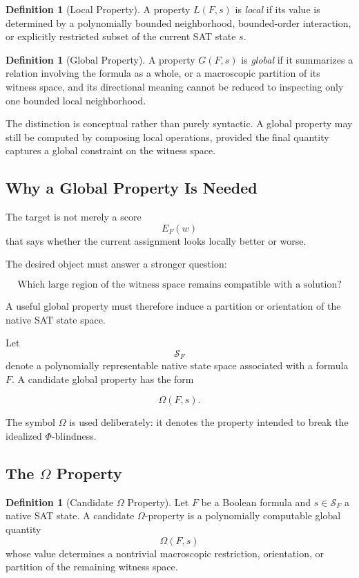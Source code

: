 \documentclass[11pt]{article}
\theoremstyle{plain}
\theoremstyle{definition}
\newtheorem{definition}[theorem]{Definition}
\begin{document}
\begin{definition}[Local Property]
A property \(L(F,s)\) is \emph{local} if its value is determined by a
polynomially bounded neighborhood, bounded-order interaction, or explicitly
restricted subset of the current SAT state \(s\).
\end{definition}

\begin{definition}[Global Property]
A property \(G(F,s)\) is \emph{global} if it summarizes a relation involving
the formula as a whole, or a macroscopic partition of its witness space, and
its directional meaning cannot be reduced to inspecting only one bounded
local neighborhood.
\end{definition}

The distinction is conceptual rather than purely syntactic.  A global
property may still be computed by composing local operations, provided the
final quantity captures a global constraint on the witness space.

\subsection{Why a Global Property Is Needed}

The target is not merely a score
\[
    E_F(w)
\]
that says whether the current assignment looks locally better or worse.

The desired object must answer a stronger question:

\[
\boxed{
\text{Which large region of the witness space remains compatible with a
solution?}
}
\]

A useful global property must therefore induce a partition or orientation of
the native SAT state space.

Let
\[
    \mathcal{S}_F
\]
denote a polynomially representable native state space associated with a
formula \(F\).  A candidate global property has the form

\[
    \Omega(F,s).
\]

The symbol \(\Omega\) is used deliberately: it denotes the property intended
to break the idealized \(\Phi\)-blindness.

\subsection{The \(\Omega\) Property}

\begin{definition}[Candidate \(\Omega\) Property]
\label{def:omega-property}
Let \(F\) be a Boolean formula and \(s\in\mathcal{S}_F\) a native SAT state.
A candidate \(\Omega\)-property is a polynomially computable global quantity
\[
    \Omega(F,s)
\]
whose value determines a nontrivial macroscopic restriction, orientation, or
partition of the remaining witness space.
\end{definition}
\end{document}
